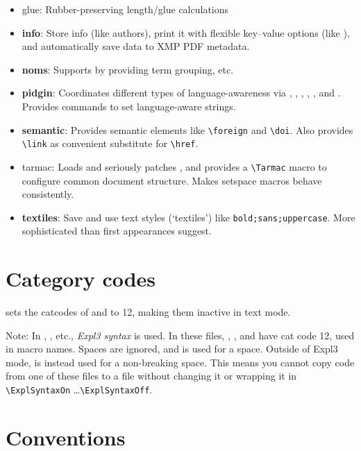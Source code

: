 \begin{BigPages} [hmargin=0.5cm, vmargin=1cm]
\begin{itemize}
    \item glue: Rubber-preserving length/glue calculations
    \item \textbf{info}: Store info (like authors),
          print it with flexible key--value options (like ),
          and automatically save data to \ac{XMP} PDF metadata.
    \item \textbf{noms}: Supports  by providing term grouping, etc.
    \item \textbf{pidgin}: Coordinates different types of language-awareness via ,
          , , , , and .
          Provides commands to set language-aware strings.
    \item \textbf{semantic}: Provides semantic elements like \verb|\foreign| and \verb|\doi|.
          Also provides \verb|\link| as convenient substitute for \verb|\href|.
    \item tarmac: Loads and seriously patches , and provides a \verb|\Tarmac| macro
          to configure common document structure. Makes setspace macros behave consistently.
    \item \textbf{textiles}: Save and use text styles (`textiles') like \verb|bold;sans;uppercase|.
          More sophisticated than first appearances suggest.
\end{itemize}

\section{Category codes}

\Desert sets the catcodes of \code{\^} and \code{\_} to 12, making them inactive in text mode.

Note:
In , , etc., \emph{Expl3 syntax} is used.
In these files, \code{\@}, \code{\_}, and \code{:} have cat code 12, used in macro names.
Spaces are ignored, and \code{\~} is used for a space.
Outside of Expl3 mode, \code{\~} is instead used for a non-breaking space.
This means you cannot copy code from one of these files to a  file
without changing it or wrapping it in \verb|\ExplSyntaxOn| \ldots \verb|\ExplSyntaxOff|.

\section{Conventions}


\end{BigPages}
